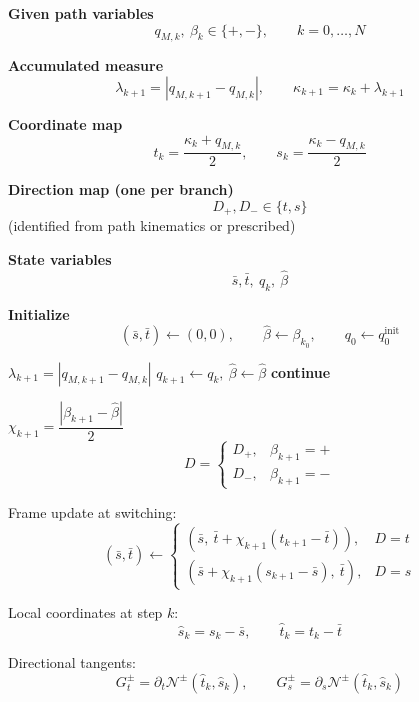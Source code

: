 \documentclass[11pt,a4paper]{article}
\begin{document}
\begin{algorithm}[H]
\caption{Incremental Differential Branchwise Evolution in $(s,t)$ Coordinates}
\begin{algorithmic}[1]

\State \textbf{Given path variables}
\[
q_{M,k},\ \beta_k\in\{+,-\},\qquad k=0,\dots,N
\]

\State \textbf{Accumulated measure}
\[
\lambda_{k+1}=|q_{M,k+1}-q_{M,k}|,\qquad
\kappa_{k+1}=\kappa_k+\lambda_{k+1}
\]

\State \textbf{Coordinate map}
\[
t_k=\frac{\kappa_k+q_{M,k}}{2},\qquad
s_k=\frac{\kappa_k-q_{M,k}}{2}
\]

\State \textbf{Direction map (one per branch)}
\[
D_+,D_-\in\{t,s\}
\]
\Statex \hspace{\algorithmicindent} (identified from path kinematics or prescribed)

\State \textbf{State variables}
\[
\bar s,\bar t,\ q_k,\ \hat\beta
\]

\State \textbf{Initialize}
\[
(\bar s,\bar t)\gets(0,0),\qquad
\hat\beta\gets\beta_{k_0},\qquad
q_0\gets q_0^{\text{init}}
\]

    \State $\lambda_{k+1}=|q_{M,k+1}-q_{M,k}|$
        \State $q_{k+1}\gets q_k,\ \hat\beta\gets\hat\beta$
        \State \textbf{continue}
    \EndIf

    \State $\chi_{k+1}=\dfrac{|\beta_{k+1}-\hat\beta|}{2}$  
    \State
    \[
    D=
    \begin{cases}
    D_+, & \beta_{k+1}=+\\
    D_-, & \beta_{k+1}=-
    \end{cases}
    \]

    \State Frame update at switching:
    \[
    (\bar s,\bar t)\gets
    \begin{cases}
    (\bar s,\ \bar t+\chi_{k+1}(t_{k+1}-\bar t)), & D=t\\
    (\bar s+\chi_{k+1}(s_{k+1}-\bar s),\ \bar t), & D=s
    \end{cases}
    \]

    \State Local coordinates at step $k$:
    \[
    \hat s_k=s_k-\bar s,\qquad
    \hat t_k=t_k-\bar t
    \]

    \State Directional tangents:
    \[
    G_t^\pm=\partial_t\mathcal N^\pm(\hat t_k,\hat s_k),\qquad
    G_s^\pm=\partial_s\mathcal N^\pm(\hat t_k,\hat s_k)
    \]


\end{algorithmic}
\end{algorithm}
\end{document}
